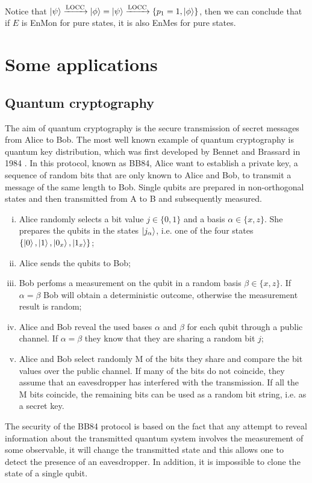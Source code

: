 \documentclass[10pt,a4paper]{book}
\numberwithin{equation}{chapter}
\numberwithin{figure}{chapter}
\numberwithin{table}{chapter}
\begin{document}
Notice that $\ket{\psi} \xrightarrow{\text{LOCC}} \ket{\phi} = \ket{\psi} \xrightarrow{\text{LOCC}} \lbrace p_1=1,\ket{\phi}\rbrace $, then we can conclude that if $E$ is EnMon for pure states, it is also EnMes for pure states. 


\section{Some applications}
\subsection{Quantum cryptography}
The aim of quantum cryptography is the secure transmission of secret messages from Alice to Bob. The most well known example of quantum cryptography is quantum key distribution, which was first developed by Bennet and Brassard in 1984 \cite{BB84}. In this protocol, known as BB84, Alice want to establish a private key, a sequence of random bits that are only known to Alice and Bob, to transmit a message of the same length to Bob. Single qubits are prepared in non-orthogonal states and then transmitted from A to B and subsequently measured. 
\begin{enumerate}[(i)]
\item Alice randomly selects a bit value $j \in \lbrace 0, 1 \rbrace$ and a basis $\alpha \in \lbrace x,z \rbrace$. She prepares the qubits in the states $\ket{j_\alpha}$, i.e. one of the four states $\lbrace \ket{0},\ket{1},\ket{0_x},\ket{1_x}\rbrace$;
\item Alice sends the qubits to Bob;
\item Bob perfoms a measurement on the qubit in a random basis $\beta \in \lbrace x,z \rbrace$. If $\alpha = \beta$ Bob will obtain a deterministic outcome, otherwise the measurement result is random;
\item Alice and Bob reveal the used bases $\alpha$ and $\beta$ for each qubit through a public channel. If $\alpha = \beta$ they know that they are sharing a random bit $j$;
\item Alice and Bob select randomly M of the bits they share and compare the bit values over the public channel. If many of the bits do not coincide, they assume that an eavesdropper has interfered with the transmission. If all the M bits coincide, the remaining bits can be used as a random bit string, i.e. as a secret key.
\end{enumerate}
The security of the BB84 protocol is based on the fact that any attempt to reveal information about the transmitted quantum system involves the measurement of some observable, it will change the transmitted state and this allows one to detect the presence of an eavesdropper. In addition, it is impossible to clone the state of a single qubit. 
\end{document}
